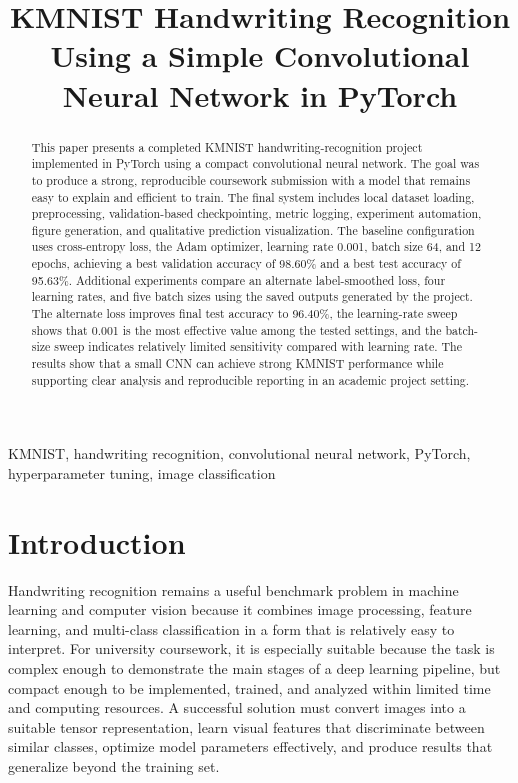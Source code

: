 \documentclass[conference]{IEEEtran}
\title{KMNIST Handwriting Recognition Using a Simple Convolutional Neural Network in PyTorch}
\author{
\IEEEauthorblockN{Family-5.3-Plus Group}
\IEEEauthorblockA{
The School of Data Science, Lingnan University\\
Repository: \url{https://github.com/Lil3bear/CDS525_Group_Project.git}\\
Team members and contribution statement are listed in Appendix A.
}
}
\begin{document}
\maketitle

\begin{abstract}
This paper presents a completed KMNIST handwriting-recognition project implemented in PyTorch using a compact convolutional neural network. The goal was to produce a strong, reproducible coursework submission with a model that remains easy to explain and efficient to train. The final system includes local dataset loading, preprocessing, validation-based checkpointing, metric logging, experiment automation, figure generation, and qualitative prediction visualization. The baseline configuration uses cross-entropy loss, the Adam optimizer, learning rate 0.001, batch size 64, and 12 epochs, achieving a best validation accuracy of 98.60\% and a best test accuracy of 95.63\%. Additional experiments compare an alternate label-smoothed loss, four learning rates, and five batch sizes using the saved outputs generated by the project. The alternate loss improves final test accuracy to 96.40\%, the learning-rate sweep shows that 0.001 is the most effective value among the tested settings, and the batch-size sweep indicates relatively limited sensitivity compared with learning rate. The results show that a small CNN can achieve strong KMNIST performance while supporting clear analysis and reproducible reporting in an academic project setting.
\end{abstract}

\begin{IEEEkeywords}
KMNIST, handwriting recognition, convolutional neural network, PyTorch, hyperparameter tuning, image classification
\end{IEEEkeywords}

\section{Introduction}

Handwriting recognition remains a useful benchmark problem in machine learning and computer vision because it combines image processing, feature learning, and multi-class classification in a form that is relatively easy to interpret. For university coursework, it is especially suitable because the task is complex enough to demonstrate the main stages of a deep learning pipeline, but compact enough to be implemented, trained, and analyzed within limited time and computing resources. A successful solution must convert images into a suitable tensor representation, learn visual features that discriminate between similar classes, optimize model parameters effectively, and produce results that generalize beyond the training set.
\end{document}
